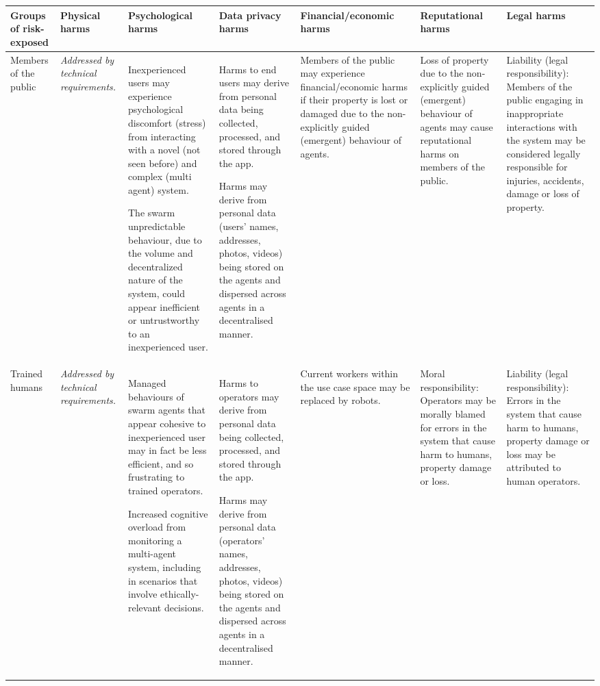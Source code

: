 \documentclass[lettersize,journal]{IEEEtran}
\begin{document}
\begin{landscape}
\begin{table}[]
\begin{tabular}{|p{0.10\textheight}|p{0.07\textheight}|p{0.20\textheight}|p{0.20\textheight}|p{0.20\textheight}|p{0.20\textheight}|p{0.20\textheight}|}
\hline
Groups of risk-exposed & Physical harms & Psychological harms & Data privacy harms  & Financial/economic harms   & Reputational harms  & Legal harms \\ \hline

Members of the public  & \textit{Addressed by technical requirements.} & Inexperienced users may experience psychological discomfort (stress) from interacting with a novel (not seen before) and complex (multi agent) system. 

The swarm unpredictable behaviour, due to the volume and decentralized nature of the system, could appear inefficient or untrustworthy to an inexperienced user. & Harms to end users may derive from personal data being collected, processed, and stored through the app. 

Harms may derive from personal data (users’ names, addresses, photos, videos) being stored on the agents and dispersed across agents in a decentralised manner. & Members of the public may experience financial/economic harms if their property is lost or damaged due to the non-explicitly guided (emergent) behaviour of agents. & Loss of property due to the non-explicitly guided (emergent) behaviour of agents may cause reputational harms on members of the public. & Liability (legal responsibility): Members of the public engaging in inappropriate interactions with the system may be considered legally responsible for injuries, accidents, damage or loss of property. \\ \hline

Trained humans  & \textit{Addressed by technical requirements.} & Managed behaviours of swarm agents that appear cohesive to inexperienced user may in fact be less efficient, and so frustrating to trained operators.

Increased cognitive overload from monitoring a multi-agent system, including in scenarios that involve ethically-relevant decisions. & Harms to operators may derive from personal data being collected, processed, and stored through the app.

Harms may derive from personal data (operators’ names, addresses, photos, videos) being stored on the agents and dispersed across agents in a decentralised manner. & Current workers within the use case space may be replaced by robots. & Moral responsibility: Operators may be morally blamed for errors in the system that cause harm to humans, property damage or loss. & Liability (legal responsibility): Errors in the system that cause harm to humans, property damage or loss may be attributed to human operators. \\ \hline


\end{tabular}
\end{table}
\end{landscape}
\end{document}
